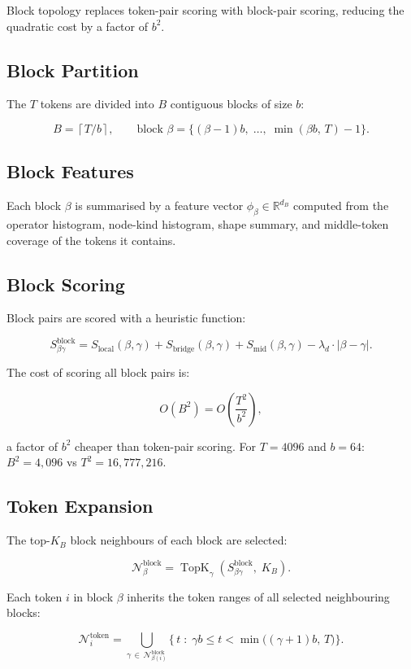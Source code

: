\documentclass[11pt]{article}
\newcommand{\R}{\mathbb{R}}
\newcommand{\TopK}{\operatorname{TopK}}
\newcommand{\ceil}[1]{\left\lceil #1 \right\rceil}
\begin{document}
Block topology replaces token-pair scoring with block-pair scoring,
reducing the quadratic cost by a factor of $b^2$.

\subsection*{Block Partition}

The $T$ tokens are divided into $B$ contiguous blocks of size $b$:

\[
B = \ceil{T/b},
\qquad
\text{block } \beta = \{(\beta-1)b,\; \ldots,\; \min(\beta b,\, T) - 1\}.
\]

\subsection*{Block Features}

Each block $\beta$ is summarised by a feature vector $\phi_\beta \in \R^{d_B}$
computed from the operator histogram, node-kind histogram, shape summary,
and middle-token coverage of the tokens it contains.

\subsection*{Block Scoring}

Block pairs are scored with a heuristic function:

\[
S_{\beta\gamma}^{\text{block}}
= S_{\text{local}}(\beta,\gamma)
+ S_{\text{bridge}}(\beta,\gamma)
+ S_{\text{mid}}(\beta,\gamma)
- \lambda_d \cdot |\beta - \gamma|.
\]

The cost of scoring all block pairs is:

\[
O(B^2) = O\!\left(\frac{T^2}{b^2}\right),
\]

a factor of $b^2$ cheaper than token-pair scoring.
For $T=4096$ and $b=64$: $B^2 = 4{,}096$ vs $T^2 = 16{,}777{,}216$.

\subsection*{Token Expansion}

The top-$K_B$ block neighbours of each block are selected:

\[
\mathcal{N}_\beta^{\text{block}}
= \TopK_\gamma\!\left(S_{\beta\gamma}^{\text{block}},\; K_B\right).
\]

Each token $i$ in block $\beta$ inherits the token ranges of all
selected neighbouring blocks:

\[
\mathcal{N}_i^{\text{token}}
= \bigcup_{\gamma\,\in\,\mathcal{N}_{\beta(i)}^{\text{block}}}
  \bigl\{\, t \;:\; \gamma b \leq t < \min\bigl((\gamma+1)b,\, T\bigr) \bigr\}.
\]
\end{document}
